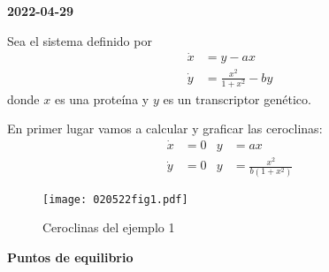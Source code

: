 \textbf{2022-04-29}
\begin{ejemplo}
	Sea el sistema definido por
	\begin{align*}
	  \dot{x} &= y - ax \\
	  \dot{y} &= \frac{x^2}{1+x^2}-by 
	\end{align*}
	donde $x$ es una proteína y  $y$ es un transcriptor genético.

	En primer lugar vamos a calcular y graficar las ceroclinas:
	 \begin{align*}
		 \dot{x} &= 0 & y &= ax \\
		 \dot{y} &= 0 & y&=\frac{x^2}{b(1+x^2)} 
	\end{align*}

  \begin{figure}[H]
  	\centering
  	\texttt{[image: 020522fig1.pdf]}
  	\caption{Ceroclinas del ejemplo 1}
  \end{figure}

	\textbf{Puntos de equilibrio}


\end{ejemplo}
